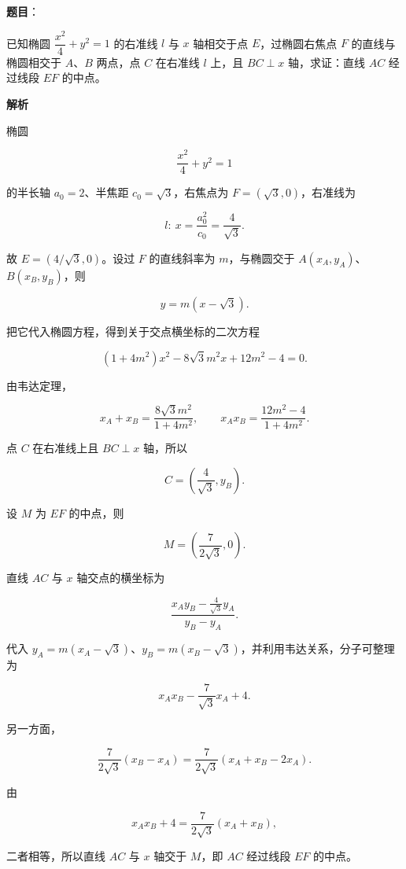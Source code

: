 \begin{answer}

\textbf{题目}：

已知椭圆 $\dfrac{x^2}{4}+y^2=1$ 的右准线 $l$ 与 $x$ 轴相交于点 $E$，过椭圆右焦点 $F$ 的直线与椭圆相交于 $A\text{、}B$ 两点，点 $C$ 在右准线 $l$ 上，且 $BC\perp x$ 轴，求证：直线 $AC$ 经过线段 $EF$ 的中点。

\textbf{解析}

椭圆

\nopagebreak[4]
\[
\frac{x^2}{4}+y^2=1
\]

的半长轴 $a_0=2$、半焦距 $c_0=\sqrt3$，右焦点为 $F=(\sqrt3,0)$，右准线为

\nopagebreak[4]
\[
l:\ x=\frac{a_0^2}{c_0}=\frac4{\sqrt3}.
\]

故 $E=(4/\sqrt3,0)$。设过 $F$ 的直线斜率为 $m$，与椭圆交于 $A(x_A,y_A)$、$B(x_B,y_B)$，则

\nopagebreak[4]
\[
y=m(x-\sqrt3).
\]

把它代入椭圆方程，得到关于交点横坐标的二次方程

\nopagebreak[4]
\[
(1+4m^2)x^2-8\sqrt3m^2x+12m^2-4=0.
\]

由韦达定理，

\nopagebreak[4]
\[
x_A+x_B=\frac{8\sqrt3m^2}{1+4m^2},
\qquad
x_Ax_B=\frac{12m^2-4}{1+4m^2}.
\]

点 $C$ 在右准线上且 $BC\perp x$ 轴，所以

\nopagebreak[4]
\[
C=\left(\frac4{\sqrt3},y_B\right).
\]

设 $M$ 为 $EF$ 的中点，则

\nopagebreak[4]
\[
M=\left(\frac7{2\sqrt3},0\right).
\]

直线 $AC$ 与 $x$ 轴交点的横坐标为

\nopagebreak[4]
\[
\frac{x_Ay_B-\frac4{\sqrt3}y_A}{y_B-y_A}.
\]

代入 $y_A=m(x_A-\sqrt3)$、$y_B=m(x_B-\sqrt3)$，并利用韦达关系，分子可整理为

\nopagebreak[4]
\[
x_Ax_B-\frac7{\sqrt3}x_A+4.
\]

另一方面，

\nopagebreak[4]
\[
\frac7{2\sqrt3}(x_B-x_A)
=\frac7{2\sqrt3}(x_A+x_B-2x_A).
\]

由

\nopagebreak[4]
\[
x_Ax_B+4=\frac7{2\sqrt3}(x_A+x_B),
\]

二者相等，所以直线 $AC$ 与 $x$ 轴交于 $M$，即 $AC$ 经过线段 $EF$ 的中点。


\end{answer}
